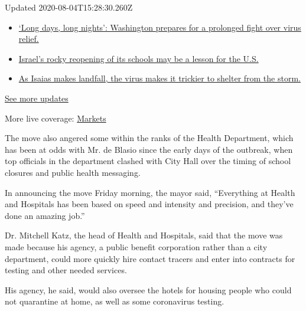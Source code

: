 Updated 2020-08-04T15:28:30.260Z

\begin{itemize}
\tightlist
\item
  \href{https://www.nytimes.com/2020/08/04/world/coronavirus-covid-19.html?action=click\&pgtype=Article\&state=default\&region=MAIN_CONTENT_1\&context=storylines_live_updates\#link-6b644638}{`Long
  days, long nights': Washington prepares for a prolonged fight over
  virus relief.}
\item
  \href{https://www.nytimes.com/2020/08/04/world/coronavirus-covid-19.html?action=click\&pgtype=Article\&state=default\&region=MAIN_CONTENT_1\&context=storylines_live_updates\#link-7af9fca0}{Israel's
  rocky reopening of its schools may be a lesson for the U.S.}
\item
  \href{https://www.nytimes.com/2020/08/04/world/coronavirus-covid-19.html?action=click\&pgtype=Article\&state=default\&region=MAIN_CONTENT_1\&context=storylines_live_updates\#link-5c0d6427}{As
  Isaias makes landfall, the virus makes it trickier to shelter from the
  storm.}
\end{itemize}

\href{https://www.nytimes.com/2020/08/04/world/coronavirus-covid-19.html?action=click\&pgtype=Article\&state=default\&region=MAIN_CONTENT_1\&context=storylines_live_updates}{See
more updates}

More live coverage:
\href{https://www.nytimes.com/live/2020/08/04/business/stock-market-today-coronavirus?action=click\&pgtype=Article\&state=default\&region=MAIN_CONTENT_1\&context=storylines_live_updates}{Markets}

The move also angered some within the ranks of the Health Department,
which has been at odds with Mr. de Blasio since the early days of the
outbreak, when top officials in the department clashed with City Hall
over the timing of school closures and public health messaging.

In announcing the move Friday morning, the mayor said, ``Everything at
Health and Hospitals has been based on speed and intensity and
precision, and they've done an amazing job.''

Dr. Mitchell Katz, the head of Health and Hospitals, said that the move
was made because his agency, a public benefit corporation rather than a
city department, could more quickly hire contact tracers and enter into
contracts for testing and other needed services.

His agency, he said, would also oversee the hotels for housing people
who could not quarantine at home, as well as some coronavirus testing.

